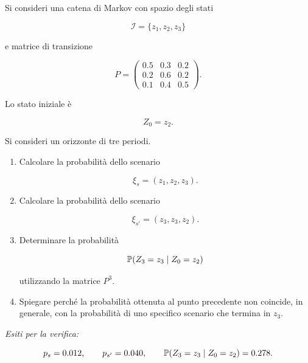\begin{exercise}

\label{ex:cap14-proposto-markov}

Si consideri una catena di Markov con spazio degli stati

\[
\mathcal I=\{z_1,z_2,z_3\}
\]

\noindent e matrice di transizione

\[
P=
\begin{pmatrix}
0.5 & 0.3 & 0.2\\
0.2 & 0.6 & 0.2\\
0.1 & 0.4 & 0.5
\end{pmatrix}.
\]

Lo stato iniziale \`e

\[
Z_0=z_2.
\]

Si consideri un orizzonte di tre periodi.

\begin{enumerate}

\item Calcolare la probabilit\`a dello scenario

\[
\xi_s=(z_1,z_2,z_3).
\]

\item Calcolare la probabilit\`a dello scenario

\[
\xi_{s'}=(z_3,z_3,z_2).
\]

\item Determinare la probabilit\`a

\[
\mathbb{P}(Z_3=z_3\mid Z_0=z_2)
\]

utilizzando la matrice $P^3$.

\item Spiegare perch\'e la probabilit\`a ottenuta al punto precedente non
coincide, in generale, con la probabilit\`a di uno specifico scenario che
termina in $z_3$.

\end{enumerate}

\medskip

\noindent
\textit{Esiti per la verifica:}

\[
p_s=0.012,
\qquad
p_{s'}=0.040,
\qquad
\mathbb{P}(Z_3=z_3\mid Z_0=z_2)=0.278.
\]

\end{exercise}


